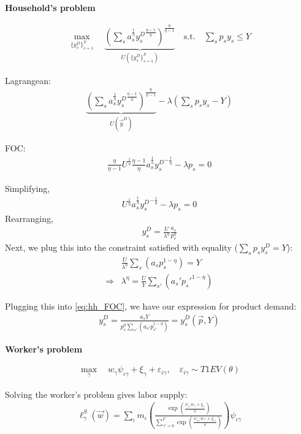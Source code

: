 \documentclass[12pt]{article}
\def\ig{\iota\gamma}
\def\g{\gamma}
\def\i{\iota}
\theoremstyle{definition}
\theoremstyle{plain}
\def\ve{\varepsilon}
\begin{document}
\textbf{Household's problem}

\begin{align*}
\max_{\{y_s^D\}_{s=1}^S} \quad \underset{U(\{y_s^D\}_{s=1}^S)}{\underbrace{ \left(\sum_s a_s^{\frac{1}{\eta}} {y_s^D}^{\frac{\eta-1}{\eta}}\right)^{\frac{\eta}{\eta-1}} }} \quad \text{s.t.} \quad \sum_s p_s y_s \leq Y
\end{align*}


Lagrangean:
\begin{align*}
\underset{U(\vec{y}^D)}{\underbrace{ \left(\sum_s a_s^{\frac{1}{\eta}} {y_s^D}^{\frac{\eta-1}{\eta}}\right)^{\frac{\eta}{\eta-1}} }} - \lambda \left(  \sum_s p_s y_s - Y \right)
\end{align*} 

FOC:
\begin{align*}
\frac{\eta}{\eta-1} U^{\frac{1}{\eta}} \frac{\eta-1}{\eta} a_s^{\frac{1}{\eta}} {y_s^D}^{-\frac{1}{\eta}} - \lambda p_s = 0
\end{align*}

Simplifying, 
\begin{align*}
U^{\frac{1}{\eta}} a_s^{\frac{1}{\eta}}  {y_s^D}^{-\frac{1}{\eta}} - \lambda p_s = 0
\end{align*}
Rearranging, 
\begin{align}
y_s^D = \frac{U}{\lambda^{\eta}} \frac{a_s}{p_s^{\eta}} \label{eq:hh_FOC}
\end{align}
Next, we plug this into the constraint satisfied with equality ($\sum_s p_s y_s^D = Y $):
\begin{align*}
&\frac{U}{\lambda^{\eta}} \sum_s \left( a_s p_s^{1-\eta} \right) = Y \\
\Rightarrow & \lambda^{\eta} = \frac{U}{Y} \sum_{s'} \left( a_s' p_s'^{1-\eta} \right)
\end{align*}

Plugging this into \ref{eq:hh_FOC}, we have our expression for product demand:
\begin{align}
y_s^D = \frac{ a_s Y}{p_s^{\eta} \sum_{s'} \left(a_{s'} p_{s'}^{1-\eta}\right)} = y_s^D(\vec{p},Y) \label{eq:product_demand}
\end{align}


\textbf{Worker's problem}

\begin{align*}
\max_{\g} \quad w_{\g} \psi_{\ig} + \xi_{\g} + \ve_{i\g}, \quad \ve_{i\g} \sim T1EV(\theta)
\end{align*}

Solving the worker's problem gives labor supply:
\begin{align}
\ell_{\g}^S(\vec{w})  = \sum_{\i} m_{\i} \left( \frac{\exp \left( \frac{\psi_{\ig} w_{\g} + \xi_{\g}}{\nu} \right) }{ \sum\limits_{\g'=0}^{\Gamma} \exp \left( \frac{\psi_{\ig'} w_{\g'} + \xi_{\g'}}{\nu} \right) } \right) \psi_{\ig} \label{eq:labor_supply}
\end{align}
\end{document}
